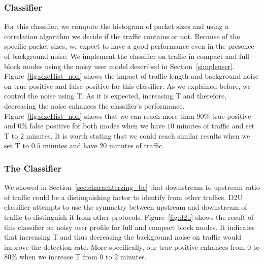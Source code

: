 \subsubsection{ Classifier}
For this classifier, we compute the histogram of packet sizes and using a correlation algorithm we decide if the traffic contains \bc or not. Because of the \bc specific packet sizes, we expect to have a good performance even in the presence of background noise.
We implement the  classifier on \bc traffic in compact and full block modes using the noisy user model described in Section~\ref{simpleuser}. Figure~\ref{fig:sizeHist_non} shows the impact of traffic length and background noise on true positive and false positive for this classifier. As we explained before, we control the noise using T. As it is expected, increasing T and therefore, decreasing the noise enhances the classifier's performance. Figure~\ref{fig:sizeHist_non} shows that we can reach more than $90\%$ true positive and $0\%$ false positive for both modes when we have $10$ minutes of traffic and set T to $2$ minutes. It is worth stating that we could reach similar results when we set T to $0.5$ minutes and have $20$ minutes of traffic. 

\subsubsection{The  Classifier}
We showed in Section~\ref{sec:charachterzing_bc} that downstream to upstream ratio of \bc traffic could be a distinguishing factor to identify \bc from other traffics. D2U classifier attempts to use the symmetry between upstream and downstream of \bc traffic to distinguish it from other protocols. Figure~\ref{fig:d2u} shows the result of this classifier on noisy user profile for full and compact block modes. It indicates that increasing T and thus decreasing the background noise on \bc traffic would improve the 
detection rate. More specifically, our true positive enhances from $0$ to $80\%$ when we increase T from $0$ to $2$ minutes.

